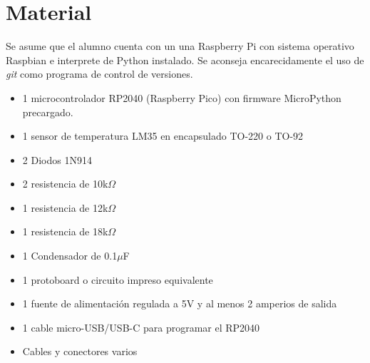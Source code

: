 %
%



\section{Material}%
\label{sec:material}
Se asume que el alumno cuenta con un una Raspberry Pi con sistema operativo Raspbian e interprete de Python instalado.
Se aconseja encarecidamente el uso de \textit{git} como programa de control de versiones.

\begin{itemize}[noitemsep]
	\item 1 microcontrolador RP2040 (Raspberry Pico) con firmware MicroPython precargado.
	\item 1 sensor de temperatura LM35 en encapsulado TO-220 o TO-92
	\item 2 Diodos 1N914
	\item 2 resistencia de 10k$\Omega$
	\item 1 resistencia de 12k$\Omega$\footnotemark
	\item 1 resistencia de 18k$\Omega$
	\item 1 Condensador de 0.1$\mu$F
	\item 1 protoboard o circuito impreso equivalente
	\item 1 fuente de alimentación regulada a 5V y al menos 2 amperios de salida
	\item 1 cable micro-USB/USB-C para programar el RP2040
	\item Cables y conectores varios
\end{itemize}
